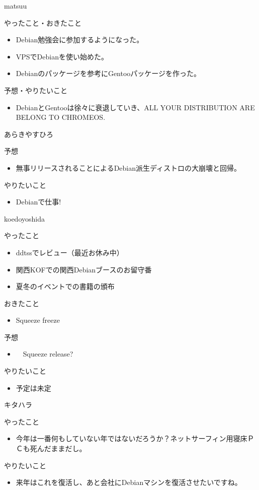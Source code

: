 \begin{prework}{ matsuu }

やったこと・おきたこと
\begin{itemize}
 \item Debian勉強会に参加するようになった。
 \item VPSでDebianを使い始めた。
 \item Debianのパッケージを参考にGentooパッケージを作った。
\end{itemize}
予想・やりたいこと
\begin{itemize}
 \item DebianとGentooは徐々に衰退していき、ALL YOUR DISTRIBUTION ARE
       BELONG TO CHROMEOS.
\end{itemize}
\end{prework}

\begin{prework}{ あらきやすひろ }

予想
\begin{itemize}
 \item 無事リリースされることによるDebian派生ディストロの大崩壊と回帰。
\end{itemize}
やりたいこと
\begin{itemize}
 \item Debianで仕事!
\end{itemize}
\end{prework}

\begin{prework}{ koedoyoshida }

やったこと
\begin{itemize}
 \item ddtssでレビュー（最近お休み中）
 \item 関西KOFでの関西Debianブースのお留守番
 \item 夏冬のイベントでの書籍の頒布
\end{itemize}
おきたこと
 \begin{itemize}
  \item Squeeze freeze
\end{itemize}
予想
\begin{itemize}
 \item 　Squeeze release?
\end{itemize}
やりたいこと
\begin{itemize}
 \item 予定は未定
\end{itemize}
\end{prework}

\begin{prework}{ キタハラ }

やったこと
\begin{itemize}
\item 今年は一番何もしていない年ではないだろうか？ネットサーフィン用寝床ＰＣも死んだままだし。
\end{itemize}
やりたいこと
\begin{itemize}
\item 来年はこれを復活し、あと会社にDebianマシンを復活させたいですね。
\end{itemize}
\end{prework}

